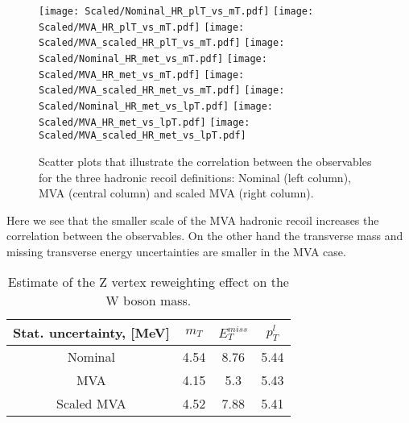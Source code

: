 \begin{figure}[tph]
	\centering
	\texttt{[image: Scaled/Nominal\_HR\_plT\_vs\_mT.pdf]}%
	\texttt{[image: Scaled/MVA\_HR\_plT\_vs\_mT.pdf]}
	\texttt{[image: Scaled/MVA\_scaled\_HR\_plT\_vs\_mT.pdf]}
	\texttt{[image: Scaled/Nominal\_HR\_met\_vs\_mT.pdf]}%
	\texttt{[image: Scaled/MVA\_HR\_met\_vs\_mT.pdf]}
	\texttt{[image: Scaled/MVA\_scaled\_HR\_met\_vs\_mT.pdf]}
	\texttt{[image: Scaled/Nominal\_HR\_met\_vs\_lpT.pdf]}%
	\texttt{[image: Scaled/MVA\_HR\_met\_vs\_lpT.pdf]}
	\texttt{[image: Scaled/MVA\_scaled\_HR\_met\_vs\_lpT.pdf]}
	\caption{Scatter plots that illustrate the correlation between the observables for the three hadronic recoil definitions: Nominal (left column), MVA (central column) and scaled MVA (right column).}
	\label{fig:mva_scatter}
\end{figure}

Here we see that the smaller scale of the MVA hadronic recoil increases the correlation between the observables. On the other hand the transverse mass and missing transverse energy uncertainties are smaller in the MVA case.

\begin{table}
	\centering
	\begin{tabular}{|c| c| c| c|}
		\hline
		Stat. uncertainty, [MeV] & $m_T$ & $E_T^{miss}$  & $p_T^{l}$ \\
		\hline
		Nominal & 4.54 &  8.76 & 5.44\\
		\hline
		MVA & 4.15 & 5.3 & 5.43\\
		\hline
		Scaled MVA & 4.52 & 7.88 & 5.41 \\
		\hline
	\end{tabular}\\
	\caption{Estimate of the Z vertex reweighting effect on the W boson mass.}
	\label{tab::mva_template}
\end{table}
